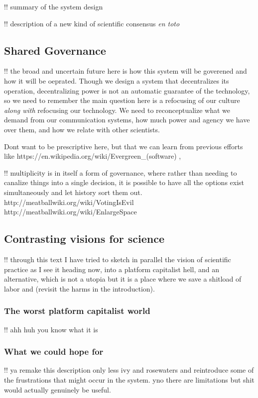 \documentclass[10pt]{article}
\begin{document}
\begin{multicols}{2}
 !! summary of the system design

!! description of a new kind of scientific consensus \emph{en toto}

\hypertarget{shared-governance}{%
\subsection{Shared Governance}\label{shared-governance}}

!! the broad and uncertain future here is how this system will be
goverened and how it will be oeprated. Though we design a system that
decentralizes its operation, decentralizing power is not an automatic
guarantee of the technology, so we need to remember the main question
here is a refocusing of our culture \emph{along with} refocusing our
technology. We need to reconceptualize what we demand from our
communication systems, how much power and agency we have over them, and
how we relate with other scientists.

Dont want to be prescriptive here, but that we can learn from previous
efforts like https://en.wikipedia.org/wiki/Evergreen\_(software) ,

!! multiplicity is in itself a form of governance, where rather than
needing to canalize things into a single decision, it is possible to
have all the options exist simultaneously and let history sort them out.
http://meatballwiki.org/wiki/VotingIsEvil
http://meatballwiki.org/wiki/EnlargeSpace

\hypertarget{contrasting-visions-for-science}{%
\subsection{Contrasting visions for
science}\label{contrasting-visions-for-science}}

!! through this text I have tried to sketch in parallel the vision of
scientific practice as I see it heading now, into a platform capitalist
hell, and an alternative, which is not a utopia but it is a place where
we save a shitload of labor and (revisit the harms in the introduction).

\hypertarget{the-worst-platform-capitalist-world}{%
\subsubsection{The worst platform capitalist
world}\label{the-worst-platform-capitalist-world}}

!! ahh huh you know what it is

\hypertarget{what-we-could-hope-for}{%
\subsubsection{What we could hope for}\label{what-we-could-hope-for}}

!! ya remake this description only less ivy and rosewaters and
reintroduce some of the frustrations that might occur in the system. yno
there are limitations but shit would actually genuinely be useful.

\end{multicols}


 
\end{document}
